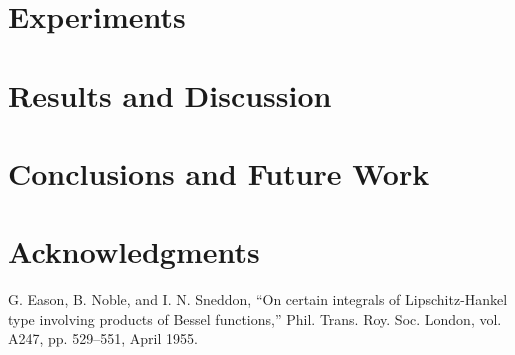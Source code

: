 \documentclass[conference]{IEEEtran}
\begin{document}
\section{Experiments}


\section{Results and Discussion}



\section{Conclusions and Future Work}


\section{Acknowledgments}


\begin{thebibliography}{00}
     G. Eason, B. Noble, and I. N. Sneddon, ``On certain integrals of Lipschitz-Hankel type involving products of Bessel functions,'' Phil. Trans. Roy. Soc. London, vol. A247, pp. 529--551, April 1955.
\end{thebibliography}
\end{document}
